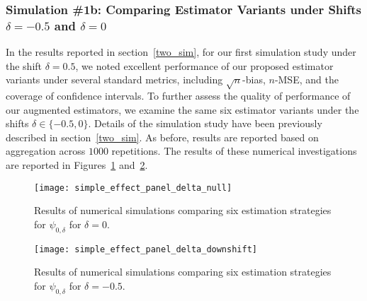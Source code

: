 \subsubsection{Simulation \#1b: Comparing Estimator Variants under Shifts
  $\delta = -0.5$ and $\delta = 0$}\label{sim1_supp}

In the results reported in section~\ref{two_sim}, for our first simulation
study under the shift $\delta = 0.5$, we noted excellent performance of our
proposed estimator variants under several standard metrics, including
$\sqrt{n}$-bias, $n$-MSE, and the coverage of confidence intervals. To further
assess the quality of performance of our augmented estimators, we examine the
same six estimator variants under the shifts $\delta \in \{-0.5, 0\}$. Details
of the simulation study have been previously described in
section~\ref{two_sim}. As before, results are reported based on aggregation
across $1000$ repetitions. The results of these numerical investigations are
reported in Figures~\ref{fig:simple_sim_delta_noshift}
and~\ref{fig:simple_sim_delta_downshift}.

\begin{figure}[H]
  \centering
  \texttt{[image: simple\_effect\_panel\_delta\_null]}
  \caption{Results of numerical simulations comparing six estimation strategies
  for $\psi_{0,\delta}$ for $\delta = 0$.}
  \label{fig:simple_sim_delta_noshift}
\end{figure}

\begin{figure}[H]
  \centering
  \texttt{[image: simple\_effect\_panel\_delta\_downshift]}
  \caption{Results of numerical simulations comparing six estimation strategies
  for $\psi_{0,\delta}$ for $\delta = -0.5$.}
  \label{fig:simple_sim_delta_downshift}
\end{figure}


